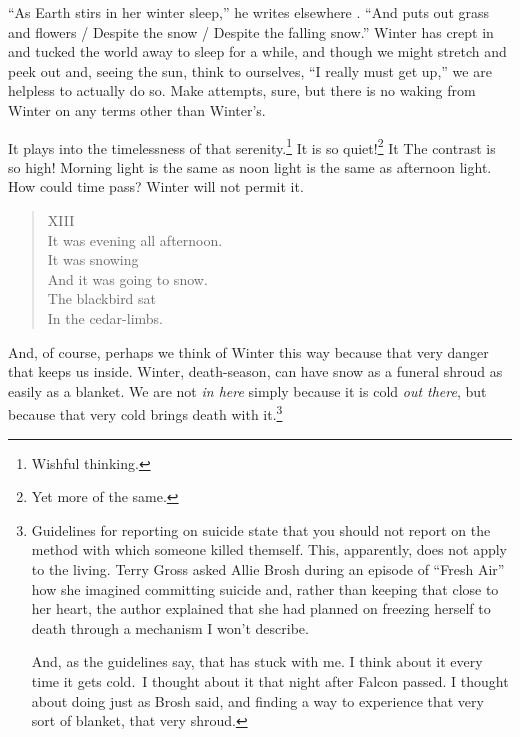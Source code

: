 \documentclass[12pt,oneside]{memoir}
\begin{document}
``As Earth stirs in her winter sleep,'' he writes elsewhere \parencite[173]{graves_poems}. ``And puts out grass and flowers / Despite the snow / Despite the falling snow.'' Winter has crept in and tucked the world away to sleep for a while, and though we might stretch and peek out and, seeing the sun, think to ourselves, ``I really must get up,'' we are helpless to actually do so. Make attempts, sure, but there is no waking from Winter on any terms other than Winter's.

It plays into the timelessness of that serenity.\footnote{Wishful thinking.} It is so quiet!\footnote{Yet more of the same.} It The contrast is so high! Morning light is the same as noon light is the same as afternoon light. How could time pass? Winter will not permit it.

\begin{verse}
XIII \\
It was evening all afternoon. \\
It was snowing \\
And it was going to snow. \\
The blackbird sat \\
In the cedar-limbs.

\parencite{blackbird}
\end{verse}

And, of course, perhaps we think of Winter this way because that very danger that keeps us inside. Winter, death-season, can have snow as a funeral shroud as easily as a blanket. We are not \emph{in here} simply because it is cold \emph{out there}, but because that very cold brings death with it.\footnote{Guidelines for reporting on suicide state that you should not report on the method with which someone killed themself. This, apparently, does not apply to the living. Terry Gross asked Allie Brosh during an episode of ``Fresh Air'' how she imagined committing suicide and, rather than keeping that close to her heart, the author explained that she had planned on freezing herself to death through a mechanism I won't describe.\par And, as the guidelines say, that has stuck with me. I think about it every time it gets cold.\footnotemark~I thought about it that night after Falcon passed. I thought about doing just as Brosh said, and finding a way to experience that very sort of blanket, that very shroud.}
\end{document}
